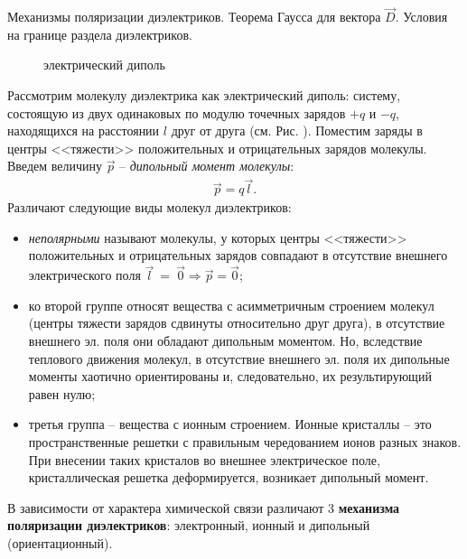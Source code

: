 \documentclass[__main__.tex]{subfiles}
\begin{document}
Механизмы поляризации диэлектриков. Теорема Гаусса для вектора $\vec{D}$. Условия на границе раздела диэлектриков.\\ 

\begin{wrapfigure}{r}{.3\linewidth}
	\centering
	
	\caption{электрический диполь}
\end{wrapfigure}

Рассмотрим молекулу диэлектрика как электрический диполь: систему, состоящую из двух одинаковых по модулю точечных зарядов $+q$ и $-q$, находящихся на расстоянии $l$ друг от друга (см. Рис. ). Поместим заряды в центры <<тяжести>> положительных и отрицательных зарядов молекулы. Введем величину $\vec{p}$ -- \emph{дипольный момент молекулы}:
\begin{gather}
	\vec{p} = q\vec{l}.
\end{gather}
Различают следующие виды молекул диэлектриков:
\begin{itemize}
	\item
	\emph{неполярными} называют молекулы, у которых центры <<тяжести>> положительных и отрицательных зарядов совпадают в отсутствие внешнего электрического поля $\vec{l}~=~\vec{0}\Rightarrow\vec{p}=\vec{0}$;
	\item
	ко второй группе относят вещества с асимметричным строением молекул (центры тяжести зарядов сдвинуты относительно друг друга), в отсутствие внешнего эл. поля они обладают дипольным моментом. Но, вследствие теплового движения молекул, в отсутствие внешнего эл. поля их дипольные моменты хаотично ориентированы и, следовательно, их результирующий равен нулю;
	\item
	третья группа -- вещества с ионным строением. Ионные кристаллы -- это пространственные решетки с правильным чередованием ионов разных знаков. При внесении таких кристалов во внешнее электрическое поле, кристаллическая решетка деформируется, возникает дипольный момент.
\end{itemize}

В зависимости от характера химической связи различают 3 \textbf{механизма поляризации диэлектриков}: электронный, ионный и дипольный (ориентационный).
\end{document}
